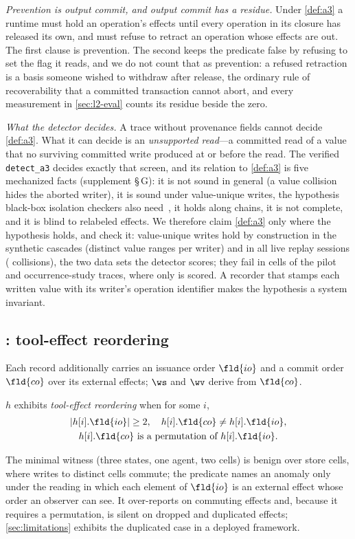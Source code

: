 \smallskip\noindent\emph{Prevention is output commit, and output commit has a
residue.} Under \cref{def:a3} a runtime must hold an operation's effects until
every operation in its closure has released its own, and must refuse to
retract an operation whose effects are out. The first clause is prevention.
The second keeps the predicate false by refusing to set the flag it reads, and
we do not count that as prevention: a refused retraction is a basis someone
wished to withdraw after release, the ordinary rule of recoverability that a
committed transaction cannot abort, and every measurement in
\cref{sec:l2-eval} counts its residue beside the zero.

\smallskip\noindent\emph{What the detector decides.} A trace without
provenance fields cannot decide \cref{def:a3}. What it can decide is an
\emph{unsupported read}---a committed read of a value that no surviving
committed write produced at or before the read. The verified
\texttt{detect\_a3} decides exactly that screen, and its relation to
\cref{def:a3} is five mechanized facts (supplement \S\,G): it is not sound
in general (a value collision hides the aborted writer), it is sound under
value-unique writes, the hypothesis black-box isolation checkers also
need~\cite{Aphyr2020Elle,TanEtAl2020Cobra}, it holds along chains, it is not
complete, and it is blind to relabeled effects. We therefore claim
\cref{def:a3} only where the hypothesis holds, and check it: value-unique
writes hold by construction in the synthetic cascades (distinct value ranges
per writer) and in all \HypLiveLtwoSessions{} live replay sessions
(\HypLiveLtwoCollisions{} collisions), the two data sets the detector scores;
they fail in \HypCollisionCells{} cells of the pilot and occurrence-study
traces, where only  is scored. A recorder that stamps each written value with its writer's operation
identifier makes the hypothesis a system invariant.

\subsection{: tool-effect reordering}
\label{sec:a6}
Each record additionally carries an issuance order $\fld{io}$ and a commit
order $\fld{co}$ over its external effects; $\ws$ and $\wv$ derive from
$\fld{co}$.
\begin{definition}
\label{def:a6}
$h$ exhibits \emph{tool-effect reordering} when for some $i$,
\[
  \begin{gathered}
  |h[i].\fld{io}|\ge 2,\quad h[i].\fld{co}\neq h[i].\fld{io},\\
  h[i].\fld{co}\ \text{is a permutation of}\ h[i].\fld{io}.
  \end{gathered}
\]
\end{definition}
The minimal witness (three states, one agent, two cells) is benign over store
cells, where writes to distinct cells commute; the predicate names an anomaly
only under the reading in which each element of $\fld{io}$ is an external
effect whose order an observer can see. It over-reports on commuting effects
and, because it requires a permutation, is silent on dropped and duplicated
effects; \cref{sec:limitations} exhibits the duplicated case in a deployed
framework.


